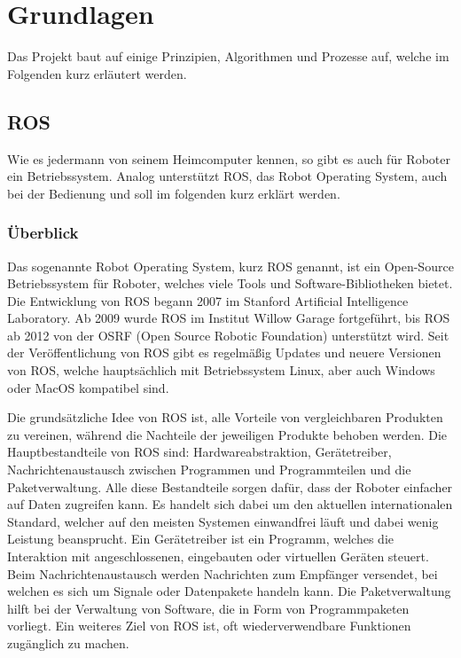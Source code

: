 
\section{Grundlagen}
{
	Das Projekt baut auf einige Prinzipien, Algorithmen und Prozesse auf, welche im Folgenden kurz erläutert werden.
	\subsection{ROS}
	{
		Wie es jedermann von seinem Heimcomputer kennen, so gibt es auch für Roboter ein Betriebssystem. Analog unterstützt ROS, das Robot Operating System, auch bei der Bedienung und soll im folgenden kurz erklärt werden.		\subsubsection{Überblick}
		{
			Das sogenannte Robot Operating System, kurz ROS genannt, ist ein Open-Source Betriebssystem für Roboter, welches viele Tools und Software-Bibliotheken bietet. Die Entwicklung von ROS begann 2007 im Stanford Artificial Intelligence Laboratory. Ab 2009 wurde ROS im Institut Willow Garage fortgeführt,\parencite{Quigley09} bis ROS ab 2012 von der OSRF (Open Source Robotic Foundation) unterstützt wird. Seit der Veröffentlichung von ROS gibt es regelmäßig Updates und neuere Versionen von ROS, welche hauptsächlich mit Betriebssystem Linux, aber auch Windows oder MacOS kompatibel sind. 
			
			Die grundsätzliche Idee von ROS ist, alle Vorteile von vergleichbaren Produkten zu vereinen, während die Nachteile der jeweiligen Produkte behoben werden. Die Hauptbestandteile von ROS sind: Hardwareabstraktion, Gerätetreiber, Nachrichtenaustausch zwischen Programmen und Programmteilen und die Paketverwaltung. Alle diese Bestandteile sorgen dafür, dass der Roboter einfacher auf Daten zugreifen kann. Es handelt sich dabei um den aktuellen internationalen Standard, welcher auf den meisten Systemen einwandfrei läuft und dabei wenig Leistung beansprucht. Ein Gerätetreiber ist ein Programm, welches die Interaktion mit angeschlossenen, eingebauten oder virtuellen Geräten steuert. Beim Nachrichtenaustausch werden Nachrichten zum Empfänger versendet, bei welchen es sich um Signale oder Datenpakete handeln kann. Die Paketverwaltung hilft bei der Verwaltung von Software, die in Form von Programmpaketen vorliegt. Ein weiteres Ziel von ROS ist, oft wiederverwendbare Funktionen zugänglich zu machen. 
			
}}}
